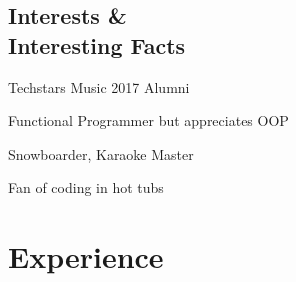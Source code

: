 \documentclass[]{friggeri-cv}
\begin{document}
\begin{aside}
  \section{Interests \& \\ \vspace*{0.1cm}Interesting Facts}
  \begin{description}\raggedleft
  	\item Techstars Music 2017 Alumni
  	\item Functional Programmer but appreciates OOP
  	\item Snowboarder, Karaoke Master
  	\item Fan of coding in hot tubs
  \end{description}
\end{aside}

\section{Experience}
\end{document}
